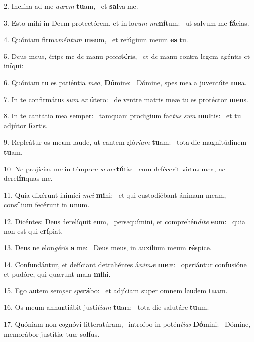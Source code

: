 2. Inclína ad me \textit{au}\textit{rem} \textbf{tu}am, \ast\  et \textbf{sal}va me.\

3. Esto mihi in Deum protectórem, et in lo\textit{cum} \textit{mu}\textbf{ní}tum: \ast\  ut salvum me \textbf{fá}cias.\

4. Quóniam firma\textit{mén}\textit{tum} \textbf{me}um, \ast\  et refúgium meum \textbf{es} tu.\

5. Deus meus, éripe me de manu \textit{pec}\textit{ca}\textbf{tó}ris, \ast\  et de manu contra legem agéntis et in\textbf{í}qui:\

6. Quóniam tu es patiéntia \textit{me}\textit{a}, \textbf{Dó}mine: \ast\  Dómine, spes mea a juventúte \textbf{me}a.\

7. In te confirmátus \textit{sum} \textit{ex} \textbf{ú}tero: \ast\  de ventre matris meæ tu es protéctor \textbf{me}us.\

8. In te cantátio mea semper: \dag\  tamquam prodígium fac\textit{tus} \textit{sum} \textbf{mul}tis: \ast\  et tu adjútor \textbf{for}tis.\

9. Repleátur os meum laude, ut cantem gló\textit{ri}\textit{am} \textbf{tu}am: \ast\  tota die magnitúdinem \textbf{tu}am.\

10. Ne projícias me in témpore \textit{se}\textit{nec}\textbf{tú}tis: \ast\  cum defécerit virtus mea, ne dere\textbf{lín}quas me.\

11. Quia dixérunt inimíci \textit{me}\textit{i} \textbf{mi}hi: \ast\  et qui custodiébant ánimam meam, consílium fecérunt in \textbf{u}num.\

12. Dicéntes: Deus derelíquit eum, \dag\  persequímini, et comprehén\textit{di}\textit{te} \textbf{e}um: \ast\  quia non est qui e\textbf{rí}piat.\

13. Deus ne elon\textit{gé}\textit{ris} \textbf{a} me: \ast\  Deus meus, in auxílium meum \textbf{ré}spice.\

14. Confundántur, et defíciant detrahéntes á\textit{ni}\textit{mæ} \textbf{me}æ: \ast\  operiántur confusióne et pudóre, qui quærunt mala \textbf{mi}hi.\

15. Ego autem sem\textit{per} \textit{spe}\textbf{rá}bo: \ast\  et adjíciam super omnem laudem \textbf{tu}am.\

16. Os meum annuntiábit justí\textit{ti}\textit{am} \textbf{tu}am: \ast\  tota die salutáre \textbf{tu}um.\

17. Quóniam non cognóvi litteratúram, \dag\  introíbo in potén\textit{ti}\textit{as} \textbf{Dó}mini: \ast\  Dómine, memorábor justítiæ tuæ so\textbf{lí}us.\

